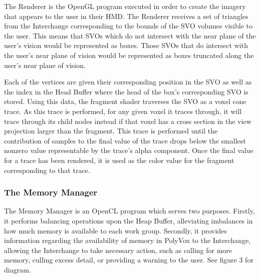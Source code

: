 \documentclass[onecolumn, draftclsnofoot,10pt, compsoc]{IEEEtran}
\begin{document}
The Renderer is the OpenGL program executed in order to create the imagery that appears to the user in their HMD. The Renderer receives a set of triangles from the Interchange corresponding to the bounds of the SVO volumes visible to the user. This means that SVOs which do not intersect with the near plane of the user’s vision would be represented as boxes. Those SVOs that do intersect with the user’s near plane of vision would be represented as boxes truncated along the user’s near plane of vision.

Each of the vertices are given their corresponding position in the SVO as well as the index in the Head Buffer where the head of the box’s corresponding SVO is stored. Using this data, the fragment shader traverses the SVO as a voxel cone trace. As this trace is performed, for any given voxel it traces through, it will trace through its child nodes instead if that voxel has a cross section in the view projection larger than the fragment. This trace is performed until the contribution of samples to the final value of the trace drops below the smallest nonzero value representable by the trace's alpha component. Once the final value for a trace has been rendered, it is used as the color value for the fragment corresponding to that trace.\\

\subsubsection{The Memory Manager}

The Memory Manager is an OpenCL program which serves two purposes. Firstly, it performs balancing operations upon the Heap Buffer, alleviating imbalances in how much memory is available to each work group. Secondly, it provides information regarding the availability of memory in PolyVox to the Interchange, allowing the Interchange to take necessary action, such as calling for more memory, culling excess detail, or providing a warning to the user. See figure 3 for diagram.
\end{document}
